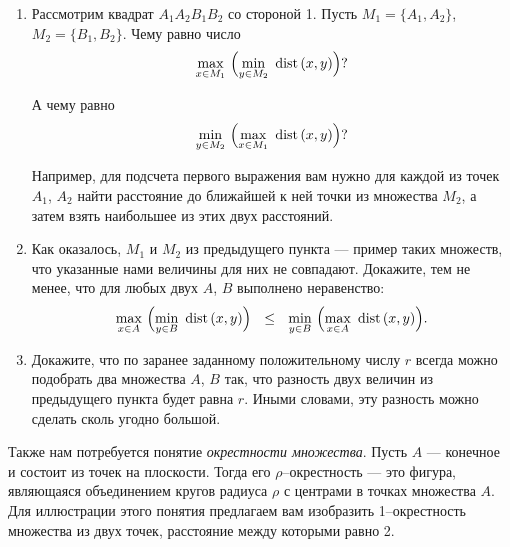 \vspace{-0.2cm}
\begin{enumerate}

\item Рассмотрим квадрат $A_1A_2B_1B_2$ со стороной 1. Пусть $M_1 = \{A_1, A_2\}$, $M_2 = \{B_1, B_2\}$. Чему равно число
\vspace{-0.2cm}
$$\max\l{x \in M_1}\ \Bigl(\min\l{y \in M_2}\ \dist (x,y)\Bigr)?$$

\vspace{-0.2cm}
А чему равно
\vspace{-0.2cm}
$$\min\l{y \in M_2}\ \Bigl(\max\l{x \in M_1}\ \dist (x,y)\Bigr)?$$

\vspace{-0.2cm}
Например, для подсчета первого выражения вам нужно для каждой из точек $A_1$, $A_2$ найти расстояние до ближайшей к ней точки из множества $M_2$, а затем взять наибольшее из этих двух расстояний.

\item Как оказалось, $M_1$ и $M_2$ из предыдущего пункта — пример таких множеств, что указанные нами величины для них не совпадают. Докажите, тем не менее, что для любых двух $A$, $B$ выполнено неравенство:
\vspace{-0.2cm}
$$\max\l{x \in A}\ \Bigl(\min\l{y \in B}\ \dist (x,y)\Bigr)\ \ \le\ \ 
	\min\l{y \in B}\ \Bigl(\max\l{x \in A}\ \dist (x,y)\Bigr).$$

\vspace{-0.45cm}
\item Докажите, что по заранее заданному положительному числу $r$ всегда можно подобрать два множества $A$, $B$ так, что разность двух величин из предыдущего пункта будет равна $r$. Иными словами, эту разность можно сделать сколь угодно большой.

\end{enumerate}

\noindent Также нам потребуется понятие {\itshape окрестности множества}. Пусть $A$ — конечное и состоит из точек на плоскости. Тогда его $\rho$--окрестность — это фигура, являющаяся объединением кругов радиуса $\rho$ с центрами в точках множества $A$. Для иллюстрации этого понятия предлагаем вам изобразить 1--окрестность множества из двух точек, расстояние между которыми равно 2.

